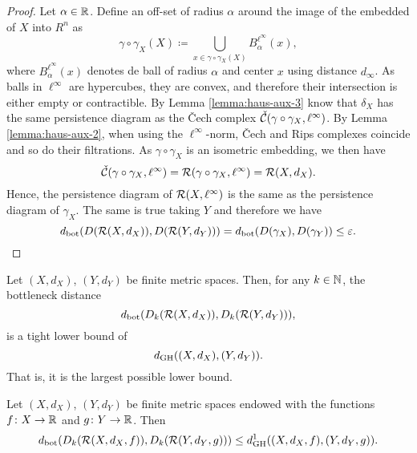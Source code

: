 \begin{proof}
    Let $\alpha \in \mathbb R $. Define an off-set of radius $ \alpha $ around the image of the embedded of $ X $ into $ R^n $ as
    \begin{equation}
        \gamma \circ \gamma_X(X) \coloneq \bigcup_{x \in \gamma \circ \gamma_X(X)} B_\alpha^{\ell^\infty}(x),
    \end{equation}
    where $ B_\alpha^{\ell^\infty}(x) $ denotes de ball of radius $ \alpha $ and center $ x $ using distance $ d_\infty $. As balls in $ \ell^\infty $ are hypercubes, they are convex, and therefore their intersection is either empty or contractible. By Lemma \ref{lemma:haus-aux-3} know that $ \delta_X $ has the same persistence diagram as the Čech complex $ \check{\mathcal{C}}(\gamma \circ \gamma_X, \ell^\infty) $. By Lemma \ref{lemma:haus-aux-2}, when using the $ \ell^\infty $-norm, Čech and Rips complexes coincide and so do their filtrations. As $ \gamma \circ \gamma_X $ is an isometric embedding, we then have
    \begin{equation}
        \check{\mathcal{C}}(\gamma \circ \gamma_X, \ell^\infty) = \mathcal{R}(\gamma \circ \gamma_X, \ell^\infty) = \mathcal{R}(X, d_X).
    \end{equation}
    Hence, the persistence diagram of $ \mathcal{R}(X, \ell^\infty) $ is the same as the persistence diagram of $ \gamma_X $. The same is true taking $ Y $ and therefore we have
    \begin{equation}
        d_{\operatorname{bot}}(D(\mathcal{R}(X, d_X)), D(\mathcal{R}(Y, d_Y))) = d_{\operatorname{bot}}(D(\gamma_X), D(\gamma_Y)) \leq \varepsilon.
    \end{equation}
\end{proof}


\begin{proposition}
    Let $ (X, d_X) $, $ (Y, d_Y) $ be finite metric spaces. Then, for any $ k \in \mathbb N$, the bottleneck distance
    $$
        d_{\operatorname{bot}}(D_k(\mathcal{R}(X, d_X)), D_k(\mathcal{R}(Y, d_Y))),
    $$
    is a tight lower bound of
    $$
        d_{\operatorname{GH}}((X, d_X), (Y, d_Y)).
    $$
    That is, it is the largest possible lower bound.
\end{proposition}

\begin{theorem}
    Let $ (X, d_X) $, $ (Y, d_Y) $ be finite metric spaces endowed with the functions $ f \colon X \to \mathbb R $ and $ g \colon Y \to \mathbb R $. Then
    $$
        d_{\operatorname{bot}}(D_k(\mathcal{R}(X, d_X, f)), D_k(\mathcal{R}(Y, d_Y, g))) \leq d_{\operatorname{GH}}^1((X, d_X, f), (Y, d_Y, g)).
    $$
\end{theorem}